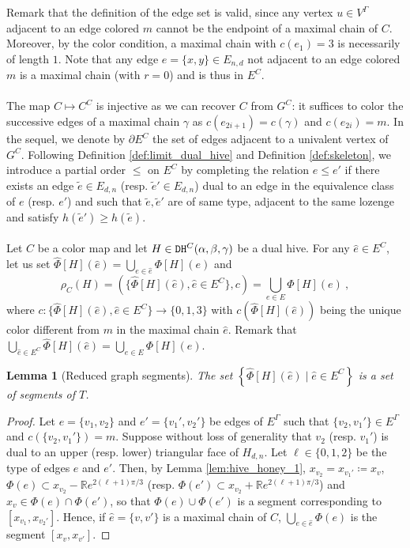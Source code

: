 \documentclass[11pt,a4paper]{amsart}
\providecommand{\dualhive}{\texttt{\textsc{DH}}}
\numberwithin{equation}{section}
\newtheorem{lemma}[theorem]{Lemma}
\theoremstyle{definition}
\begin{document}
\noindent
Remark that the definition of the edge set is valid, 
since any vertex $u\in V^\Gamma$ adjacent to an edge colored $m$ 
cannot be the endpoint of a maximal chain of $C$. 
Moreover, by the color condition, a maximal chain with $c(e_1)=3$ 
is necessarily of length $1$. 
Note that any edge $e = \{x, y\} \in E_{n, d}$ not adjacent to an edge 
colored $m$ is a maximal chain (with $r=0$) and is thus in $E^C$.
\\
\\
The map $C\mapsto C^C$ is injective as we can recover $C$ 
from $G^C$: it suffices to color the successive edges of a 
maximal chain $\gamma$ as $c(e_{2i+1})=c(\gamma)$ and $c(e_{2i})=m$.
In the sequel, we denote by $\partial E^C$ 
the set of edges adjacent to a univalent vertex of $G^C$. 
Following Definition \ref{def:limit_dual_hive} and Definition \ref{def:skeleton}, 
we introduce a partial order $\leqslant$ on $E^C$ by completing the relation 
$e\leqslant e'$
if there exists an edge $\tilde{e}\in E_{d,n}$ 
(resp. $\tilde{e}'\in E_{d,n}$) dual to an edge in the equivalence class of 
$e$ (resp. $e'$) and such that $\tilde{e},\tilde{e}'$ are of same type, 
adjacent to the same lozenge and satisfy $h(\tilde{e}')\geqslant h(\tilde{e})$. 
\\
\\
Let $C$ be a color map and let $H \in \dualhive^C(\alpha,\beta,\gamma)$ 
be a dual hive. For any $\hat{e} \in E^C$, let us set 
$\hat{\Phi}[H](\hat{e})=\bigcup_{e\in \hat{e}}\Phi[H](e)$ and
$$\rho_C(H)=\left(\{\hat{\Phi}[H](\hat{e}) 
,\hat{e}\in E^C\},c\right)=\bigcup_{e\in E}\Phi[H](e) \ ,$$
where $c:\{\hat{\Phi}[H](\hat{e}) 
,\hat{e}\in E^C\}\rightarrow \{0,1,3\}$ with $c(\hat{\Phi}[H](\hat{e}))$ being the unique color different from $m$ in the maximal chain $\hat{e}$. Remark that $\bigcup_{\hat{e}\in E^C}\hat{\Phi}[H](\hat{e}) =\bigcup_{e\in E}\Phi[H](e)$.
\begin{lemma}[Reduced graph segments]
    The set $ \left\{\hat{\Phi}[H](\hat{e}) \mid \hat{e}\in E^C \right\}$ 
    is a set of segments of $T$.
\end{lemma}

\begin{proof}
    Let $e=\{v_1,v_2\}$ and $e'=\{v_1',v_2'\}$ be edges of $E^\Gamma$ such that 
    $\{v_2,v_1'\}\in E^\Gamma$ and $c(\{v_2,v_1'\})=m$. 
    Suppose without loss of generality that $v_2$ (resp. $v_1'$) 
    is dual to an upper (resp. lower) triangular face of $H_{d,n}$. 
    Let $\ell \in \{0, 1, 2\}$ be the type of edges $e$ and $e'$.
    Then, by Lemma \ref{lem:hive_honey_1}, $x_{v_2}=x_{v_1'} \coloneqq x_v$, 
    $\Phi(e)\subset x_{v_2}-\mathbb{R}e^{2(\ell+1)\pi/3}$ 
    (resp. $\Phi(e')\subset x_{v_2}+\mathbb{R}e^{2(\ell+1)\pi/3}$) 
    and $x_v\in \Phi(e)\cap \Phi(e')$, so that $\Phi(e)\cup \Phi(e')$ is 
    a segment corresponding to $[x_{v_1},x_{v_2'}]$. 
    Hence, if $\hat{e}=\{v,v'\}$ is a maximal chain of $C$, 
    $\bigcup_{e\in \hat{e}}\Phi(e)$ is the segment $[x_{v},x_{v'}]$.
\end{proof}
\end{document}
